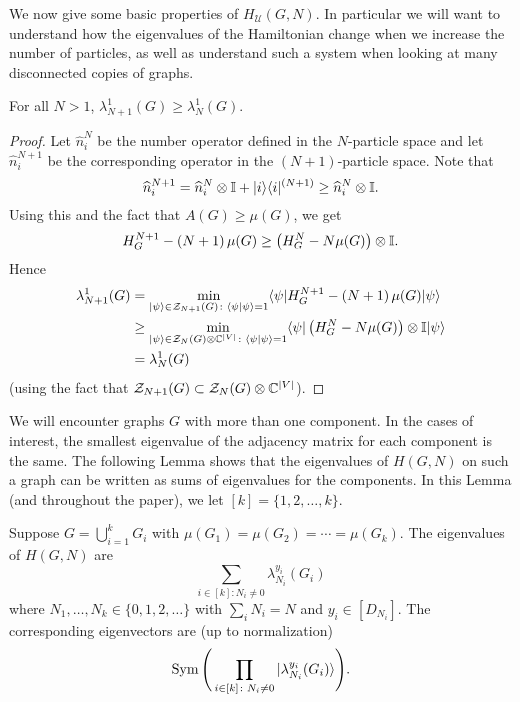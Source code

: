 \documentclass[../thesis-main/thesis-main]{subfiles}
\begin{document}
We now give some basic properties of $H_{\mathcal{U}}(G,N)$.  In particular we will want to understand how the eigenvalues of the Hamiltonian change when we increase the number of particles, as well as understand such a system when looking at many disconnected copies of graphs.

\begin{lemma}
  For all $N>1$, $\lambda_{N+1}^1(G) \geq \lambda_{N}^1(G)$.
\end{lemma}
\begin{proof}
Let $\widehat{n}_{i}^{N}$ be the number operator  defined in the $N$-particle space and let $\widehat{n}_{i}^{N+1}$ be the corresponding operator in the $\left(N+1\right)$-particle space. Note that
\begin{equation}
\widehat{n}_{i}^{N+1} = \widehat{n}_{i}^{N}\otimes\mathbb{I}+|i\rangle\langle i|^{(N+1)} \geq \widehat{n}_{i}^{N}\otimes\mathbb{I}.
\end{equation}
Using this and the fact that $A(G)\geq\mu(G)$, we get 
\begin{equation}
H_{G}^{N+1}-\left(N+1\right)\mu(G)\geq\left(H_{G}^{N}-N\mu(G)\right)\otimes\mathbb{I}.
\end{equation}
Hence 
\begin{align}
  \lambda_{N+1}^{1}(G) & =\min_{|\psi\rangle\in\mathcal{Z}_{N+1}(G)\colon \langle\psi|\psi\rangle=1}\langle\psi|H_{G}^{N+1}-\left(N+1\right)\mu(G)|\psi\rangle\\
 & \geq\min_{|\psi\rangle\in\mathcal{Z}_{N}(G)\otimes\mathbb{C}^{|V|}\colon \langle\psi|\psi\rangle=1}\langle\psi|\left(H_{G}^{N}-N\mu(G)\right)\otimes\mathbb{I} |\psi\rangle\\
 & =\lambda_{N}^{1}(G)
\end{align}
(using the fact that $\mathcal{Z}_{N+1}(G)\subset\mathcal{Z}_{N}(G)\otimes\mathbb{C}^{|V|}$). 
\end{proof}
We will encounter graphs $G$ with more than one component. In the cases of interest, the smallest eigenvalue of the adjacency matrix for each component is the same. The following Lemma shows that the eigenvalues of $H(G,N)$ on such a graph can be written as sums of eigenvalues for the components. In this Lemma (and throughout the paper), we let $[k] = \{1,2,\ldots,k\}$.

\begin{lemma}
\label{lem:BH_disconnected_graphs}
Suppose $G=\bigcup_{i=1}^{k}G_{i}$ with $\mu(G_{1})=\mu(G_{2})=\cdots=\mu(G_{k})$. The eigenvalues of $H(G,N)$ are 
\begin{equation}
\sum_{i\in[k]\colon N_{i}\neq0}\lambda_{N_{i}}^{y_{i}}(G_{i})
\end{equation}
where $N_{1},\ldots,N_{k}\in\{0,1,2,\ldots\}$ with $\sum_{i}N_{i}=N$ and $y_{i}\in[D_{N_{i}}].$ The corresponding eigenvectors are (up to normalization) 
\begin{equation}
\operatorname{Sym}\Bigg(\prod_{i\in[k]\colon N_{i}\neq0}|\lambda_{N_{i}}^{y_{i}}(G_{i})\rangle\Bigg).
\label{eq:eigvecs_disconnected}
\end{equation}
\end{lemma}
\end{document}
